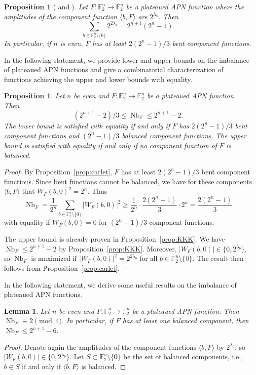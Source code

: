 \documentclass[11pt]{article}
\newcommand{\F}{\mathbb F}
\DeclareMathOperator{\Nb}{Nb}
\theoremstyle{plain}
\newtheorem{lemma}[theorem]{Lemma}
\newtheorem{proposition}[theorem]{Proposition}
\theoremstyle{definition}
\numberwithin{theorem}{section}
\numberwithin{equation}{section}
\numberwithin{table}{section}
\numberwithin{figure}{section}
\begin{document}
{\begin{proposition}[{\cite[Proposition 9]{carlet2015boolean} and \cite[Corollary 3]{berger2006almost} \label{prop:carlet}}]
      Let $F \colon \F_2^n \rightarrow \F_2^n$ be a plateaued APN function where the amplitudes of the component function $\langle b,F \rangle$ are $2^{\lambda_b}$. Then 
      \begin{equation} \label{eq:carlet}
                \sum_{b \in \F_2^n \setminus \{0\}}2^{2\lambda_b} = 2^{n+1}(2^n-1).
      \end{equation}
      In particular, if $n$ is even, $F$ has at least $2(2^n-1)/3$ bent component functions.
\end{proposition}

In the following statement, we provide lower and upper bounds on the imbalance of plateaued APN functions and give a combinatorial characterization of functions achieving the upper and lower bounds with equality.
\begin{proposition}\label{prop: APNs with extreme imbalance}
     Let $n$ be even and $F \colon \F_2^n \rightarrow \F_2^n$ be a plateaued APN function. Then 
     \[(2^{n+1}-2)/3\leq \Nb_F \leq 2^{n+1}-2.\]
     The lower bound is satisfied with equality if and only if $F$ has $2(2^n-1)/3$ bent component functions and $(2^n-1)/3$ balanced component functions. The upper bound is satisfied with equality if and only if no component function of $F$ is balanced.
\end{proposition}
\begin{proof}
    By Proposition~\ref{prop:carlet}, $F$ has at least $2(2^n-1)/3$ bent component functions. Since bent functions cannot be balanced, we have for these components $\langle b,F \rangle$ that $W_F(b,0)^2=2^n$. Thus
    \[\Nb_F=\frac{1}{2^n}\sum_{b \in \F_2^n \setminus \{0\}}|W_F(b,0)|^2 \geq \frac{1}{2^n} \cdot \frac{2(2^n-1)}{3} \cdot 2^n=\frac{2(2^n-1)}{3}\]
    with equality if $W_F(b,0)=0$ for $(2^n-1)/3$ component functions.
    
    The upper bound is already proven in Proposition~\ref{prop:KKK}. We have $\Nb_F \leq  2^{n+1}-2$ by Proposition~\ref{prop:KKK}. Moreover, $|W_F(b,0)| \in \{0,2^{\lambda_b}\}$, so $\Nb_F$ is maximized if $|W_F(b,0)|^2=2^{2\lambda_b}$ for all $b\in \F_2^n \setminus \{0\}$. The result then follows from Proposition~\ref{prop:carlet}.
\end{proof}


In the following statement, we derive some useful results on the imbalance of plateaued APN functions.
\begin{lemma} \label{lem:balanced}
    Let $n$ be even and $F \colon \F_2^n \rightarrow \F_2^n$ be a plateaued APN function. Then $\Nb_F \equiv 2 \pmod 4$. In particular, if $F$ has at least one balanced component, then $\Nb_F \leq 2^{n+1}-6.$
\end{lemma}
\begin{proof}
     Denote again the  amplitudes of the component functions $\langle b,F \rangle$ by $2^{\lambda_b}$, so $|W_F(b,0)| \in \{0,2^{\lambda_b}\}$. Let $S \subset \F_2^n \setminus \{0\}$ be the set of balanced components, i.e., $b \in S$ if and only if $\langle b,F \rangle$ is balanced. 
     

\end{proof}}
\end{document}
